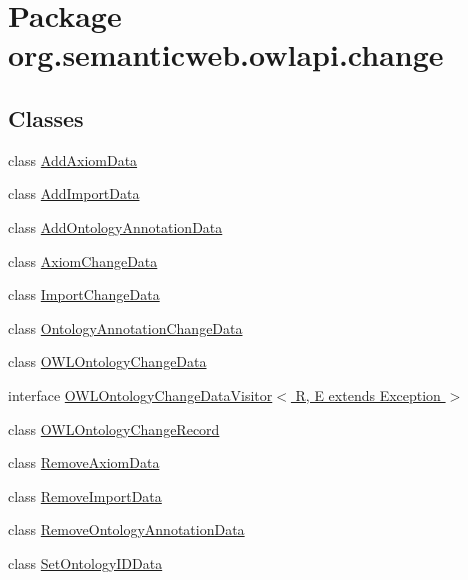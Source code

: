 \hypertarget{namespaceorg_1_1semanticweb_1_1owlapi_1_1change}{\section{Package org.\-semanticweb.\-owlapi.\-change}
\label{namespaceorg_1_1semanticweb_1_1owlapi_1_1change}
}
\subsection*{Classes}
\begin{DoxyCompactItemize}
\item 
class \hyperlink{classorg_1_1semanticweb_1_1owlapi_1_1change_1_1_add_axiom_data}{Add\-Axiom\-Data}
\item 
class \hyperlink{classorg_1_1semanticweb_1_1owlapi_1_1change_1_1_add_import_data}{Add\-Import\-Data}
\item 
class \hyperlink{classorg_1_1semanticweb_1_1owlapi_1_1change_1_1_add_ontology_annotation_data}{Add\-Ontology\-Annotation\-Data}
\item 
class \hyperlink{classorg_1_1semanticweb_1_1owlapi_1_1change_1_1_axiom_change_data}{Axiom\-Change\-Data}
\item 
class \hyperlink{classorg_1_1semanticweb_1_1owlapi_1_1change_1_1_import_change_data}{Import\-Change\-Data}
\item 
class \hyperlink{classorg_1_1semanticweb_1_1owlapi_1_1change_1_1_ontology_annotation_change_data}{Ontology\-Annotation\-Change\-Data}
\item 
class \hyperlink{classorg_1_1semanticweb_1_1owlapi_1_1change_1_1_o_w_l_ontology_change_data}{O\-W\-L\-Ontology\-Change\-Data}
\item 
interface \hyperlink{interfaceorg_1_1semanticweb_1_1owlapi_1_1change_1_1_o_w_l_ontology_change_data_visitor_3_01_r_00c34458b96d5c21378bf54ce9e4f41fc8}{O\-W\-L\-Ontology\-Change\-Data\-Visitor$<$ R, E extends Exception $>$}
\item 
class \hyperlink{classorg_1_1semanticweb_1_1owlapi_1_1change_1_1_o_w_l_ontology_change_record}{O\-W\-L\-Ontology\-Change\-Record}
\item 
class \hyperlink{classorg_1_1semanticweb_1_1owlapi_1_1change_1_1_remove_axiom_data}{Remove\-Axiom\-Data}
\item 
class \hyperlink{classorg_1_1semanticweb_1_1owlapi_1_1change_1_1_remove_import_data}{Remove\-Import\-Data}
\item 
class \hyperlink{classorg_1_1semanticweb_1_1owlapi_1_1change_1_1_remove_ontology_annotation_data}{Remove\-Ontology\-Annotation\-Data}
\item 
class \hyperlink{classorg_1_1semanticweb_1_1owlapi_1_1change_1_1_set_ontology_i_d_data}{Set\-Ontology\-I\-D\-Data}
\end{DoxyCompactItemize}
